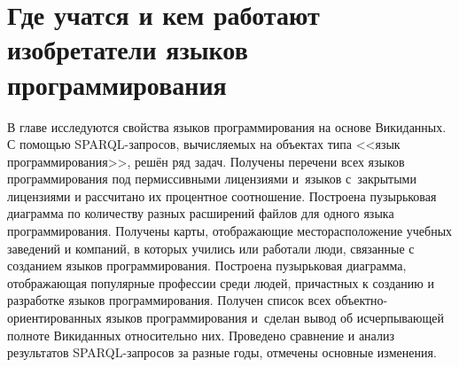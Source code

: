 \chapter{Где учатся и кем работают изобретатели языков программирования}
\label{ch:programming languages}

В главе исследуются свойства языков программирования на основе Викиданных. 
С помощью SPARQL-запросов, вычисляемых на объектах типа <<язык программирования>>, решён ряд задач. 
Получены перечени всех языков программирования под пермиссивными лицензиями 
и~языков с~закрытыми лицензиями и рассчитано их процентное соотношение. 
Построена пузырьковая диаграмма по количеству разных расширений файлов для одного языка программирования. 
Получены карты, отображающие месторасположение учебных заведений и компаний, 
в которых учились или работали люди, связанные с созданием языков программирования. 
Построена пузырьковая диаграмма, отображающая популярные профессии среди людей, 
причастных к созданию и разработке языков программирования. 
Получен список всех объектно-ориентированных языков программирования 
и~сделан вывод об исчерпывающей полноте Викиданных относительно них. 
Проведено сравнение и анализ результатов SPARQL-запросов за разные годы, отмечены основные изменения. 

